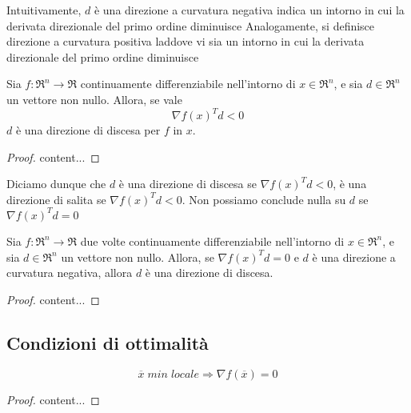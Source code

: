 Intuitivamente, $d$ è una direzione a curvatura negativa indica un intorno in cui la derivata direzionale del primo ordine diminuisce
Analogamente, si definisce direzione a curvatura positiva laddove vi sia un intorno in cui la derivata direzionale del primo ordine diminuisce

\begin{theorem}
	\label{thm:descent-condition-1}
	Sia $f:\Re^{n}\rightarrow\Re$ continuamente differenziabile nell'intorno di $x\in\Re^{n}$, e sia $d\in\Re^{n}$ un vettore non nullo. Allora, se vale
	\begin{equation}
	\label{eqn:descent-condition-1}
	\nabla f(x)^{T}d < 0
	\end{equation}
	$d$ è una direzione di discesa per $f$ in $x$.
	\begin{proof}
		content...
	\end{proof}
\end{theorem}

Diciamo dunque che $d$ è una direzione di discesa se $\nabla f(x)^{T}d<0$, è una direzione di salita se $\nabla f(x)^{T}d<0$. Non possiamo conclude nulla su $d$ se $\nabla f(x)^{T}d=0$

\begin{theorem}
	\label{thm:descent-condition-2}
	Sia $f:\Re^{n}\rightarrow\Re$ due volte continuamente differenziabile nell'intorno di $x\in\Re^{n}$, e sia $d\in\Re^{n}$ un vettore non nullo. Allora, se $\nabla f(x)^{T}d=0$ e $d$ è una direzione a curvatura negativa, allora $d$ è una direzione di discesa.
	\begin{proof}
		content...
	\end{proof}
\end{theorem}

\subsection{Condizioni di ottimalità}

\begin{theorem}
	\label{thm:optimality-condition-necessary-1}
	\begin{equation}
		\label{eqn:optimality-condition-necessary-1}
		\overline{x}\;min\;locale\Rightarrow\nabla f(\overline{x})=0
	\end{equation}
	\begin{proof}
		content...
	\end{proof}
\end{theorem}

